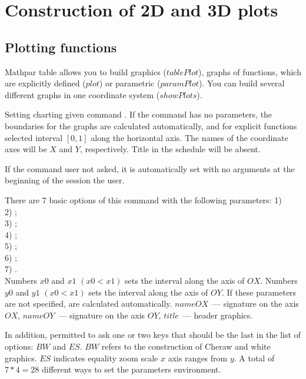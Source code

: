 \chapter{Construction of 2D and 3D plots}
\section{Plotting functions}
Mathpar table allows you to build graphics ($tablePlot$), graphs of functions, which are explicitly defined ($plot$) or parametric ($paramPlot$).
You can build several different graphs in one coordinate system ($showPlots$).

Setting charting given command .
If the command  has no parameters, the boundaries for the graphs are calculated automatically, and for explicit functions selected interval
$[0,1]$ along the horizontal axis. The names of the coordinate axes will be $X$ and $Y$, respectively. Title in the schedule will be absent.

If the command  user not asked, it is automatically set  with no arguments at the beginning of the session
the user.

There are 7 basic options of this command with the following parameters:
1) \\
2) ;\\
3) ;\\
4) ;\\
5) ;\\
6) ;\\
7) .\\

Numbers $x0$ and $x1$ $(x0<x1)$ sets the interval along the axis of $OX$. Numbers $y0$ and $y1$ $(x0<x1)$ sets the interval along the axis of $OY$.
If these parameters are not specified, are calculated automatically. $nameOX$~--- signature on the axis $OX$, $nameOY$~--- signature on the axis $OY$, 
$title$~--- header graphics.

In addition, permitted to ask one or two keys that should be the last in the list of options: $BW$ and $ES$.
$BW$ refers to the construction of Cheraw and white graphics. $ES$ indicates equality zoom scale  $x$ axis ranges from $y$.
A total of $7*4=28$ different ways to set the parameters environment.

